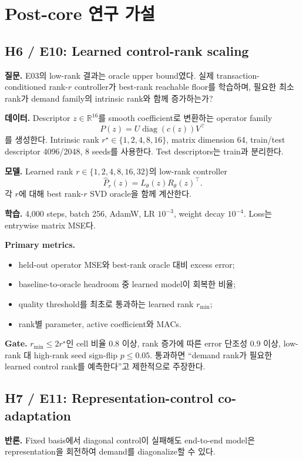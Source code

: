 \documentclass[10.3pt,a4paper]{article}
\newcommand{\R}{\mathbb{R}}
\begin{document}
\section{Post-core 연구 가설}
\subsection{H6 / E10: Learned control-rank scaling}
\textbf{질문.} E03의 low-rank 결과는 oracle upper bound였다. 실제 transaction-conditioned rank-$r$ controller가 best-rank reachable floor를 학습하며, 필요한 최소 rank가 demand family의 intrinsic rank와 함께 증가하는가?

\textbf{데이터.} Descriptor $z\in\R^{16}$를 smooth coefficient로 변환하는 operator family
\[
P(z)=U\operatorname{diag}(c(z))V^\top
\]
를 생성한다. Intrinsic rank $r^\star\in\{1,2,4,8,16\}$, matrix dimension 64, train/test descriptor 4096/2048, 8 seeds를 사용한다. Test descriptors는 train과 분리한다.

\textbf{모델.} Learned rank $r\in\{1,2,4,8,16,32\}$의 low-rank controller
\[
\widehat P_r(z)=L_\theta(z)R_\theta(z)^\top.
\]
각 $r$에 대해 best rank-$r$ SVD oracle을 함께 계산한다.

\textbf{학습.} 4,000 steps, batch 256, AdamW, LR $10^{-3}$, weight decay $10^{-4}$. Loss는 entrywise matrix MSE다.

\textbf{Primary metrics.}
\begin{itemize}
\item held-out operator MSE와 best-rank oracle 대비 excess error;
\item baseline-to-oracle headroom 중 learned model이 회복한 비율;
\item quality threshold를 최초로 통과하는 learned rank $r_{\min}$;
\item rank별 parameter, active coefficient와 MACs.
\end{itemize}

\textbf{Gate.} $r_{\min}\le2r^\star$인 cell 비율 0.8 이상, rank 증가에 따른 error 단조성 0.9 이상, low-rank 대 high-rank seed sign-flip $p\le0.05$. 통과하면 ``demand rank가 필요한 learned control rank를 예측한다''고 제한적으로 주장한다.

\subsection{H7 / E11: Representation-control co-adaptation}
\textbf{반론.} Fixed basis에서 diagonal control이 실패해도 end-to-end model은 representation을 회전하여 demand를 diagonalize할 수 있다.
\end{document}
